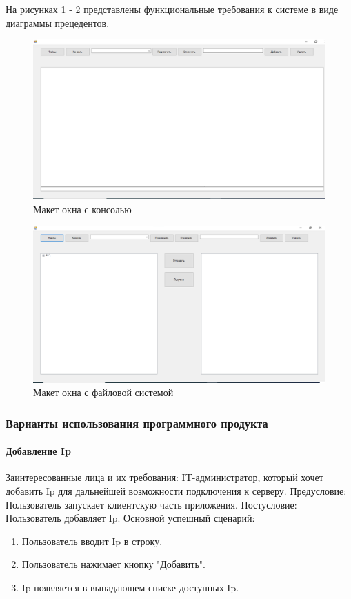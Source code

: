 На рисунках \ref{fig:-maket_one} - \ref{fig:-maket_two} представлены функциональные требования к системе в виде диаграммы прецедентов.
\begin{figure}
	\centering
	\includegraphics[width=0.7\linewidth]{"images/Макет окна(консоль)"}
	\caption{Макет окна с консолью}
	\label{fig:-maket_one}
\end{figure}
\begin{figure}
	\centering
	\includegraphics[width=0.7\linewidth]{"images/Макет окна(файлы)"}
	\caption{Макет окна с файловой системой}
	\label{fig:-maket_two}
\end{figure}

\subsubsection{Варианты использования программного продукта}
\paragraph{Добавление Ip}
Заинтересованные лица и их требования: IT-администратор, который хочет добавить Ip для дальнейшей возможности подключения к серверу.
Предусловие: Пользователь запускает клиентскую часть приложения.
Постусловие: Пользователь добавляет Ip.
Основной успешный сценарий:
\begin{enumerate}
	\item Пользователь вводит Ip в строку.
	\item Пользователь нажимает кнопку "Добавить".
	\item Ip появляется в выпадающем списке доступных Ip.
\end{enumerate}

